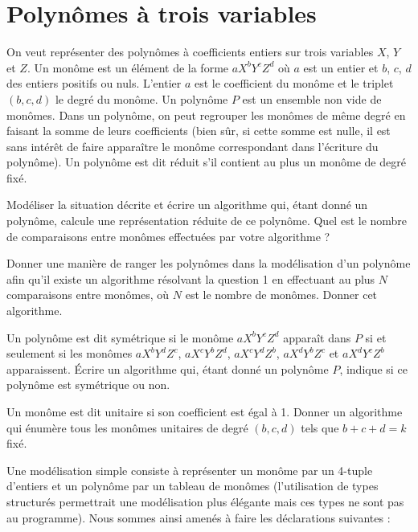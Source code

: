 \renewcommand{\SourceFile}{7-arithmetique-et-calculs-numeriques/src/7-3.ml}

\section{Polynômes à trois variables}

On veut représenter des polynômes à coefficients entiers sur trois variables $X$, $Y$ et $Z$. Un monôme est un élément de la forme $aX^bY^cZ^d$ où $a$ est un entier et $b$, $c$, $d$ des entiers positifs ou nuls. L'entier $a$ est le coefficient du monôme et le triplet $(b,c,d)$ le degré du monôme. Un polynôme $P$ est un ensemble non vide de monômes. Dans un polynôme, on peut regrouper les monômes de même degré en faisant la somme de leurs coefficients (bien sûr, si cette somme est nulle, il est sans intérêt de faire apparaître le monôme correspondant dans l'écriture du polynôme). Un polynôme est dit réduit s'il contient au plus un monôme de degré fixé.

\Q
Modéliser la situation décrite et écrire un algorithme qui, étant donné un polynôme, calcule une représentation réduite de ce polynôme. Quel est le nombre de comparaisons entre monômes effectuées par votre algorithme ?

\Q
Donner une manière de ranger les polynômes dans la modélisation d'un polynôme afin qu'il existe un algorithme résolvant la question 1 en effectuant au plus $N$ comparaisons entre monômes, où $N$ est le nombre de monômes. Donner cet algorithme.

\Q
Un polynôme est dit symétrique si le monôme $aX^bY^cZ^d$ apparaît dans $P$ si et seulement si les monômes $aX^bY^dZ^c$, $aX^cY^bZ^d$, $aX^cY^dZ^b$, $aX^dY^bZ^c$ et $aX^dY^cZ^b$ apparaissent. Écrire un algorithme qui, étant donné un polynôme $P$, indique si ce polynôme est symétrique ou non.

\Q
Un monôme est dit unitaire si son coefficient est égal à 1. Donner un algorithme qui énumère tous les monômes unitaires de degré $(b,c,d)$ tels que $b+c+d=k$ fixé.

\Corrige

\Q
Une modélisation simple consiste à représenter un monôme par un 4-tuple d'entiers et un polynôme par un tableau de monômes (l'utilisation de types structurés permettrait une modélisation plus élégante mais ces types ne sont pas au programme). Nous sommes ainsi amenés à faire les déclarations suivantes :



